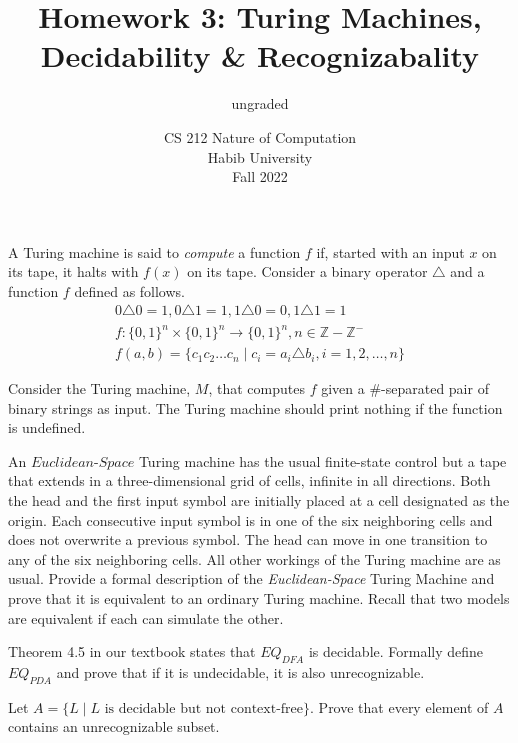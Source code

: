 \documentclass[addpoints]{exam}
\title{Homework 3: Turing Machines, Decidability \& Recognizabality}
\author{ungraded} %
\date{CS 212 Nature of Computation\\Habib University\\Fall 2022}
\begin{document}
\maketitle

\begin{questions}

\question \label{q:lang} A Turing machine is said to \textit{compute} a function $f$ if, started with an input $x$ on its tape, it halts with $f(x)$ on its tape. Consider a binary operator $\triangle$ and a function $f$ defined as follows.
  \begin{align*}
    0\triangle 0=1, 0\triangle 1=1, 1\triangle 0=0,1\triangle 1=1\\
    f:\{0,1\}^n\times \{0,1\}^n\to \{0,1\}^n, n\in \mathbb{Z}-\mathbb{Z}^-    \\
    f(a,b) = \{ c_1c_2\ldots c_n \mid c_i = a_i\triangle b_i, i = 1,2,\ldots,n\}
  \end{align*}

Consider the Turing machine, $M$, that computes $f$ given a $\#$-separated pair of binary strings as input. The Turing machine should print nothing if the function is undefined.


\question [10] An $\textit{Euclidean-Space}$ Turing machine has the usual finite-state control but a tape that extends in a three-dimensional grid of cells, infinite in all directions. Both the head and the first input symbol are initially placed at a cell designated as the origin. Each consecutive input symbol is in one of the six neighboring cells and does not overwrite a previous symbol. The head can move in one transition to any of the six neighboring cells. All other workings of the Turing machine are as usual. Provide a formal description of the \textit{Euclidean-Space} Turing Machine and prove that it is equivalent to an ordinary Turing machine. Recall that two models are equivalent if each can simulate the other.

\question [10] Theorem 4.5 in our textbook states that $EQ_{DFA}$ is decidable. Formally define $EQ_{PDA}$ and prove that if it is undecidable, it is also unrecognizable. 

  
\question [10] Let $A = \{L \mid L\text{ is decidable but not context-free}\}$. Prove that every element of $A$ contains an unrecognizable subset.


\end{questions}
\end{document}
